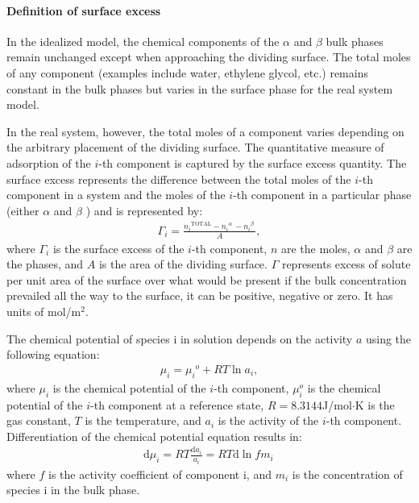\paragraph{Definition of surface excess}
In the idealized model, the chemical components of the $\alpha$ and $\beta$ bulk phases remain unchanged except when approaching the dividing surface.
The total moles of any component (examples include water, ethylene glycol, etc.) remains constant in the bulk phases but varies in the surface phase
for the real system model.

In the real system, however, the total moles of a component varies depending on the arbitrary placement of the dividing surface. 
The quantitative measure of adsorption of the $i$-th component is captured by the surface excess quantity. 
The surface excess represents the difference between the total moles of the $i$-th component in a system and the moles of the $i$-th 
component in a particular phase (either $\alpha$ and $\beta$ ) and is represented by:
\begin{eqnarray}
\Gamma_i = \frac{{n_i}^{\text{TOTAL}} - {n_i}^{\alpha}\, - {n_i}^{\beta}\,}{A},
\label{4}
\end{eqnarray}
where $\Gamma_i$ is the surface excess of the $i$-th component, $n$ are the moles,  $\alpha$ and $\beta$ are the phases, and $A$ is the area of the dividing surface.
$\Gamma$ represents excess of solute per unit area of the surface over what would be present if the bulk concentration prevailed all the way to the surface, 
it can be positive, negative or zero. It has units of mol/m$^2$.


The chemical potential of species i in solution depends on the activity $a$ using the following equation:\cite{Hiemenz1997}
\begin{eqnarray}
\mu_i = {\mu_i}^o + RT \ln a_i,
\label{5}
\end{eqnarray}
where $\mu_i$ is the chemical potential of the $i$-th component, $\mu_i^o$ is the chemical potential of the $i$-th component at a reference state, 
$R= 8.3144$J/mol$\cdot$K is the gas constant, $T$ is the temperature, and $a_i$ is the activity of the $i$-th component.
Differentiation of the chemical potential equation results in:
\begin{eqnarray}
\mathrm{d}\mu_i  = RT \frac{\mathrm{d}a_i}{a_i} = RT \mathrm{d}\ln fm_i\,
\label{5}
\end{eqnarray}
where $f$ is the activity coefficient of component i, and $m_i$ is the concentration of species i in the bulk phase.

